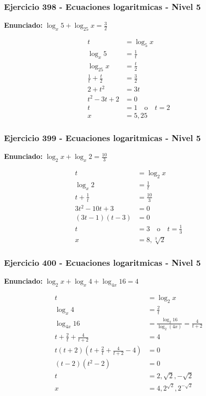 \documentclass[12pt,a4paper]{article}
\begin{document}
\subsubsection*{Ejercicio 398 - Ecuaciones logaritmicas - Nivel 5}
\textbf{Enunciado:} \(\log_x5+\log_{25}x=\frac32\)

\[
\begin{aligned}
t&=\log_5x\\
\log_x5&=\frac1t\\
\log_{25}x&=\frac t2\\
\frac1t+\frac t2&=\frac32\\
2+t^2&=3t\\
t^2-3t+2&=0\\
t&=1\quad \text{o}\quad t=2\\
x&=\boxed{5,25}
\end{aligned}
\]


\subsubsection*{Ejercicio 399 - Ecuaciones logaritmicas - Nivel 5}
\textbf{Enunciado:} \(\log_2x+\log_x2=\frac{10}{3}\)

\[
\begin{aligned}
t&=\log_2x\\
\log_x2&=\frac1t\\
t+\frac1t&=\frac{10}{3}\\
3t^2-10t+3&=0\\
(3t-1)(t-3)&=0\\
t&=3\quad \text{o}\quad t=\frac13\\
x&=\boxed{8,\sqrt[3]{2}}
\end{aligned}
\]


\subsubsection*{Ejercicio 400 - Ecuaciones logaritmicas - Nivel 5}
\textbf{Enunciado:} \(\log_2x+\log_x4+\log_{4x}16=4\)

\[
\begin{aligned}
t&=\log_2x\\
\log_x4&=\frac2t\\
\log_{4x}16&=\frac{\log_2 16}{\log_2(4x)}=\frac4{t+2}\\
t+\frac2t+\frac4{t+2}&=4\\
t(t+2)\left(t+\frac2t+\frac4{t+2}-4\right)&=0\\
(t-2)(t^2-2)&=0\\
t&=2,\sqrt2,-\sqrt2\\
x&=\boxed{4,2^{\sqrt2},2^{-\sqrt2}}
\end{aligned}
\]
\end{document}
